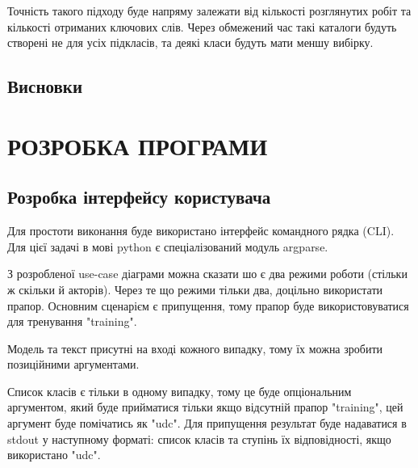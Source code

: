 \documentclass[14pt]{extarticle}
\let\oldsection\section
\renewcommand{\section}{\clearpage\oldsection}
\begin{document}
  Точність такого підходу буде напряму залежати від кількості розглянутих робіт
  та кількості отриманих ключових слів.
  Через обмежений час такі каталоги будуть створені не для усіх підкласів,
  та деякі класи будуть мати меншу вибірку.

  \subsection{Висновки}

  \section{РОЗРОБКА ПРОГРАМИ}
  \subsection{Розробка інтерфейсу користувача}
  Для простоти виконання буде використано інтерфейс командного рядка (CLI). 
  Для цієї задачі в мові python є спеціалізований модуль argparse.

  З розробленої use-case діаграми можна сказати шо є два режими роботи
  (стільки  ж скільки й акторів).
  Через те що режими тільки два, доцільно використати прапор.
  Основним сценарієм є припущення,
  тому прапор буде використовуватися для тренування "\-\-training".
  
  Модель та текст присутні на вході кожного випадку,
  тому їх можна зробити позиційними аргументами.
  
  Список класів є тільки в одному випадку,
  тому це буде опціональним аргументом,
  який буде прийматися тільки якщо відсутній прапор "\-\-training",
  цей аргумент буде помічатись як "\-\-udc".
  Для припущення результат буде надаватися в stdout у наступному форматі:
  список класів та ступінь їх відповідності, якщо використано "\-\-udc".
  
\end{document}
